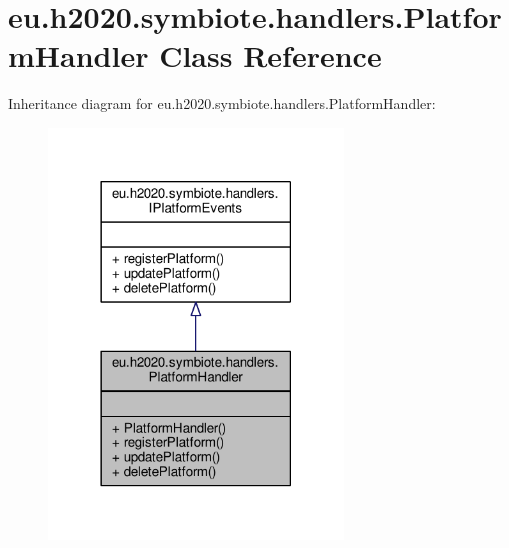 \hypertarget{classeu_1_1h2020_1_1symbiote_1_1handlers_1_1PlatformHandler}{}\section{eu.\+h2020.\+symbiote.\+handlers.\+Platform\+Handler Class Reference}
\label{classeu_1_1h2020_1_1symbiote_1_1handlers_1_1PlatformHandler}


Inheritance diagram for eu.\+h2020.\+symbiote.\+handlers.\+Platform\+Handler\+:
\nopagebreak
\begin{figure}[H]
\begin{center}
\leavevmode
\includegraphics[width=222pt]{classeu_1_1h2020_1_1symbiote_1_1handlers_1_1PlatformHandler__inherit__graph}
\end{center}
\end{figure}



